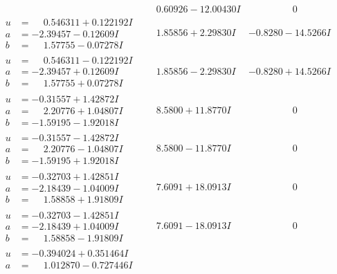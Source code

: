 \documentclass[1p]{elsarticle_modified}
\theoremstyle{definition}
\begin{document}
$$\begin{array}{c|c|c}
 & \phantom{-}0.60926 - 12.00430 I & \phantom{-0.000000 } 0 \\ \hline\begin{aligned}
u &= \phantom{-}0.546311 + 0.122192 I \\
a &= -2.39457 - 0.12609 I \\
b &= \phantom{-}1.57755 - 0.07278 I\end{aligned}
 & \phantom{-}1.85856 + 2.29830 I & -0.8280 - 14.5266 I \\ \hline\begin{aligned}
u &= \phantom{-}0.546311 - 0.122192 I \\
a &= -2.39457 + 0.12609 I \\
b &= \phantom{-}1.57755 + 0.07278 I\end{aligned}
 & \phantom{-}1.85856 - 2.29830 I & -0.8280 + 14.5266 I \\ \hline\begin{aligned}
u &= -0.31557 + 1.42872 I \\
a &= \phantom{-}2.20776 + 1.04807 I \\
b &= -1.59195 - 1.92018 I\end{aligned}
 & \phantom{-}8.5800 + 11.8770 I & \phantom{-0.000000 } 0 \\ \hline\begin{aligned}
u &= -0.31557 - 1.42872 I \\
a &= \phantom{-}2.20776 - 1.04807 I \\
b &= -1.59195 + 1.92018 I\end{aligned}
 & \phantom{-}8.5800 - 11.8770 I & \phantom{-0.000000 } 0 \\ \hline\begin{aligned}
u &= -0.32703 + 1.42851 I \\
a &= -2.18439 - 1.04009 I \\
b &= \phantom{-}1.58858 + 1.91809 I\end{aligned}
 & \phantom{-}7.6091 + 18.0913 I & \phantom{-0.000000 } 0 \\ \hline\begin{aligned}
u &= -0.32703 - 1.42851 I \\
a &= -2.18439 + 1.04009 I \\
b &= \phantom{-}1.58858 - 1.91809 I\end{aligned}
 & \phantom{-}7.6091 - 18.0913 I & \phantom{-0.000000 } 0 \\ \hline\begin{aligned}
u &= -0.394024 + 0.351464 I \\
a &= \phantom{-}1.012870 - 0.727446 I \\

\end{aligned}
\end{array}$$
\end{document}
